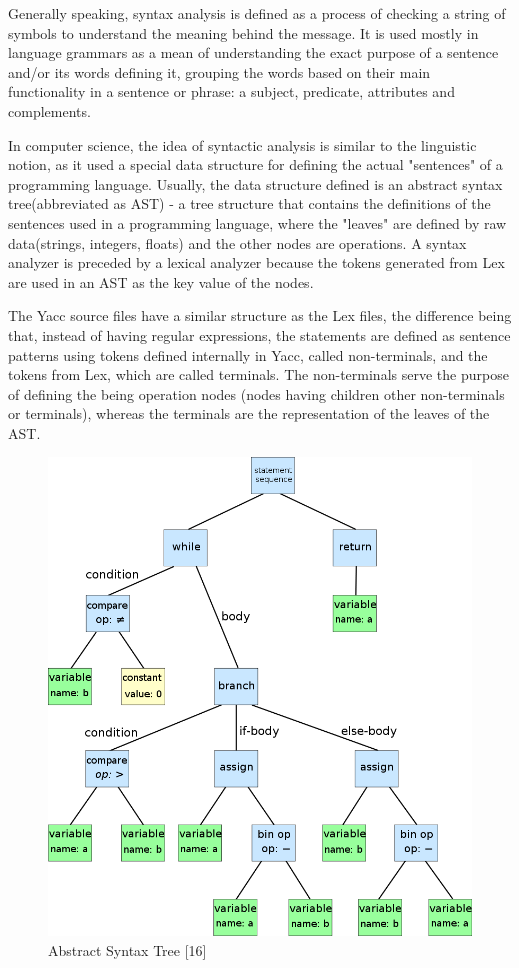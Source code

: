 \documentclass[12pt,a4paper,twoside]{report}
\begin{document}
Generally speaking, syntax analysis is defined as a process of checking a string of symbols to understand the meaning behind the message. It is used mostly in language grammars as a mean of understanding the exact purpose of a sentence and/or its words defining it, grouping the words based on their main functionality in a sentence or phrase: a subject, predicate, attributes and complements. 

In computer science, the idea of syntactic analysis is similar to the linguistic notion, as it used a special data structure for defining the actual "sentences" of a programming language. Usually, the data structure defined is an abstract syntax tree(abbreviated as AST) - a tree structure that contains the definitions of the sentences used in a programming language, where the "leaves" are defined by raw data(strings, integers, floats) and the other nodes are operations. A syntax analyzer is preceded by a lexical analyzer because the tokens generated from Lex are used in an AST as the key value of the nodes. 

The Yacc source files have a similar structure as the Lex files, the difference being that, instead of having regular expressions, the statements are defined as sentence patterns using tokens defined internally in Yacc, called non-terminals, and the tokens from Lex, which are called terminals. The non-terminals serve the purpose of defining the being operation nodes (nodes having children other non-terminals or terminals), whereas the terminals are the representation of the leaves of the AST. 


\begin{figure}[H]
	\centering
	\includegraphics[scale=0.45]{img/diags/AST.png}
	\caption{Abstract Syntax Tree [16]}
\end{figure}
\end{document}

